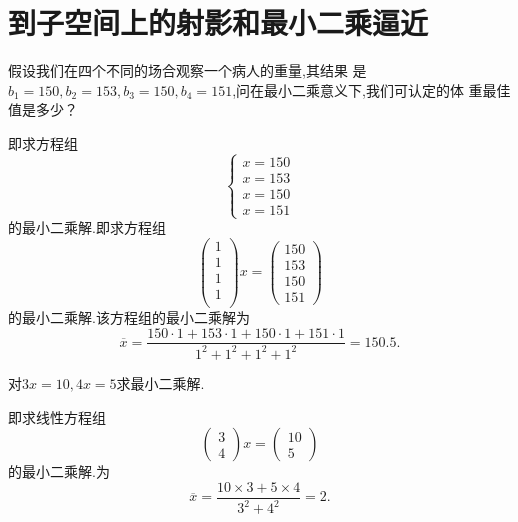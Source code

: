 ﻿\documentclass{book} \usepackage{exsheets} \usepackage{xeCJK}
\begin{document}
\section{到子空间上的射影和最小二乘逼近}
\begin{question}
  假设我们在四个不同的场合观察一个病人的重量,其结果
  是$b_1=150,b_2=153,b_3=150,b_4=151$,问在最小二乘意义下,我们可认定的体
  重最佳值是多少？
\end{question}
\begin{solution}
  即求方程组
$$
\begin{cases}
  x=150\\
  x=153\\
  x=150\\
  x=151
\end{cases}
$$
的最小二乘解.即求方程组
$$
\begin{pmatrix}
  1\\
  1\\
  1\\
  1\\
\end{pmatrix}x=
\begin{pmatrix}
  150\\
  153\\
  150\\
  151
\end{pmatrix}
$$
的最小二乘解.该方程组的最小二乘解为
$$
\overline{x}=\frac{150\cdot 1+153\cdot 1+150\cdot 1+151\cdot
  1}{1^2+1^2+1^2+1^2}=150.5.
$$
\end{solution}
\begin{question}
  对$3x=10,4x=5$求最小二乘解.
\end{question}
\begin{solution}
  即求线性方程组
$$
\begin{pmatrix}
  3\\
  4
\end{pmatrix}x=
\begin{pmatrix}
  10\\
  5
\end{pmatrix}
$$
的最小二乘解.为
$$
\overline{x}=\frac{10\times 3+5\times 4}{3^2+4^2}=2.
$$
\end{solution}
\end{document}
